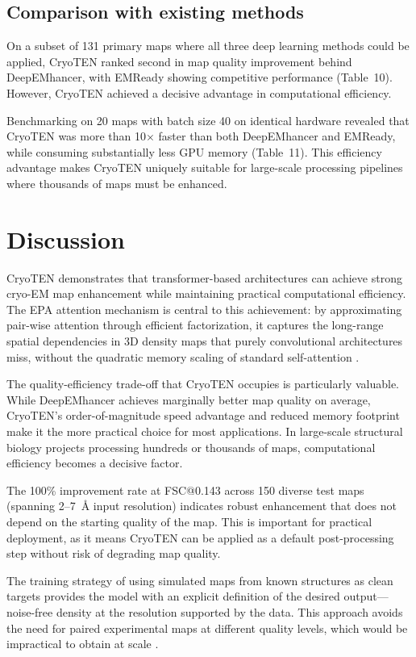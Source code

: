 \documentclass[11pt]{article}
\begin{document}
\subsection{Comparison with existing methods}

On a subset of 131 primary maps where all three deep learning methods could be applied, CryoTEN ranked second in map quality improvement behind DeepEMhancer, with EMReady showing competitive performance (Table~10). However, CryoTEN achieved a decisive advantage in computational efficiency.

Benchmarking on 20 maps with batch size 40 on identical hardware revealed that CryoTEN was more than 10$\times$ faster than both DeepEMhancer and EMReady, while consuming substantially less GPU memory (Table~11). This efficiency advantage makes CryoTEN uniquely suitable for large-scale processing pipelines where thousands of maps must be enhanced.

\section{Discussion}

CryoTEN demonstrates that transformer-based architectures can achieve strong cryo-EM map enhancement while maintaining practical computational efficiency. The EPA attention mechanism is central to this achievement: by approximating pair-wise attention through efficient factorization, it captures the long-range spatial dependencies in 3D density maps that purely convolutional architectures miss, without the quadratic memory scaling of standard self-attention \citep{cheng2018single}.

The quality-efficiency trade-off that CryoTEN occupies is particularly valuable. While DeepEMhancer achieves marginally better map quality on average, CryoTEN's order-of-magnitude speed advantage and reduced memory footprint make it the more practical choice for most applications. In large-scale structural biology projects processing hundreds or thousands of maps, computational efficiency becomes a decisive factor.

The 100\% improvement rate at FSC@0.143 across 150 diverse test maps (spanning 2--7~\AA{} input resolution) indicates robust enhancement that does not depend on the starting quality of the map. This is important for practical deployment, as it means CryoTEN can be applied as a default post-processing step without risk of degrading map quality.

The training strategy of using simulated maps from known structures as clean targets provides the model with an explicit definition of the desired output---noise-free density at the resolution supported by the data. This approach avoids the need for paired experimental maps at different quality levels, which would be impractical to obtain at scale \citep{sanchez2021deepemhancer}.
\end{document}
